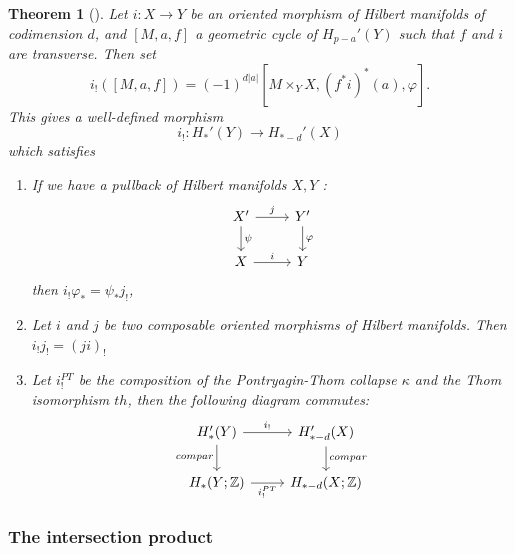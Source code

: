 \documentclass[reqno]{amsart}
\newtheorem{theorem}{Theorem}[section]
\theoremstyle{definition}
\theoremstyle{remark}
\begin{document}
\begin{theorem}[]\cite[Theorem 3.3.1]{Chataur}
    Let $i \colon X \to Y$ be an oriented morphism of
    Hilbert manifolds of codimension $d$, and
    $\left[ M,a,f \right] $ a geometric cycle of
    $H_{p-a}'(Y)$ such that $f$ and $i$ are transverse. Then set
    \[
    i_! \left( \left[ M,a,f \right]  \right) =
    \left( -1 \right)^{d \left| a \right| }
    \left[ M \times_Y X , \left( f^{*}i \right)^{*}(a),
    \varphi \right].
    \] 
    This gives a well-defined morphism
    \[
    i_! \colon H_*'(Y) \to H_{* -d}'(X)
    \] 
    which satisfies
    \begin{enumerate}
        \item If we have a pullback of Hilbert manifolds
            $X,Y$ :
            \begin{equation*}
            \begin{tikzcd}
                X' \ar[r, "j"] \ar[d, "\psi "] & Y' \ar[d, "\varphi "] \\
                X \ar[r, "i"] & Y
            \end{tikzcd}
            \end{equation*}
            then $i_! \varphi_* = \psi_* j_!$,
        \item Let $i$ and $j$ be two composable oriented morphisms of
            Hilbert manifolds. Then $i_! j_! = 
            \left( ji \right)_!$ 
        \item Let $i_!^{PT}$ be the composition of the
            Pontryagin-Thom collapse $\kappa$ and the Thom
            isomorphism $th$, then the following diagram commutes:
            \begin{equation*}
            \begin{tikzcd}
                H_*'(Y) \ar[d, "compar"'] \ar[r, "i_!"] & 
                H_{*-d}'(X) \ar[d, "compar"] \\
                H_*(Y;\mathbb{Z}) \ar[r, "i_!^{PT}"'] &
                H_{*-d}(X;\mathbb{Z})
            \end{tikzcd}
            \end{equation*}
            
    \end{enumerate}
\end{theorem}


\subsubsection{The intersection product}
\end{document}
